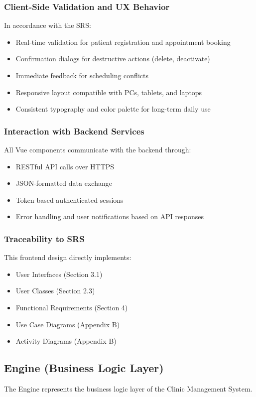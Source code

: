 \subsubsection{Client-Side Validation and UX Behavior}
In accordance with the SRS:
\begin{itemize}
	\item Real-time validation for patient registration and appointment booking
	\item Confirmation dialogs for destructive actions (delete, deactivate)
	\item Immediate feedback for scheduling conflicts
	\item Responsive layout compatible with PCs, tablets, and laptops
	\item Consistent typography and color palette for long-term daily use
\end{itemize}

\subsubsection{Interaction with Backend Services}
All Vue components communicate with the backend through:
\begin{itemize}
	\item RESTful API calls over HTTPS
	\item JSON-formatted data exchange
	\item Token-based authenticated sessions
	\item Error handling and user notifications based on API responses
\end{itemize}

\subsubsection{Traceability to SRS}
This frontend design directly implements:
\begin{itemize}
	\item User Interfaces (Section 3.1)
	\item User Classes (Section 2.3)
	\item Functional Requirements (Section 4)
	\item Use Case Diagrams (Appendix B)
	\item Activity Diagrams (Appendix B)
\end{itemize}
\subsection{Engine  (Business Logic Layer)}
The Engine represents the business logic layer of the Clinic Management System.

